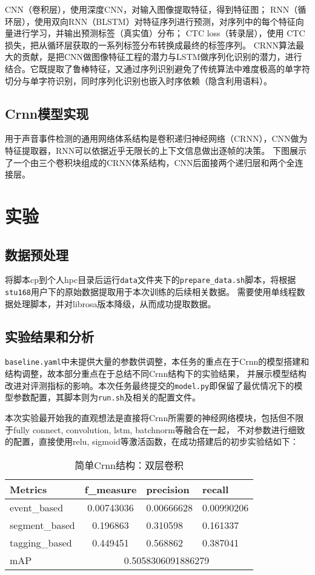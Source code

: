 \documentclass[]{ctexart}
\begin{document}
CNN（卷积层），使用深度CNN，对输入图像提取特征，得到特征图；
RNN（循环层），使用双向RNN（BLSTM）对特征序列进行预测，对序列中的每个特征向量进行学习，并输出预测标签（真实值）分布；
CTC loss（转录层），使用 CTC 损失，把从循环层获取的一系列标签分布转换成最终的标签序列。
CRNN算法最大的贡献，是把CNN做图像特征工程的潜力与LSTM做序列化识别的潜力，进行结合。它既提取了鲁棒特征，又通过序列识别避免了传统算法中难度极高的单字符切分与单字符识别，同时序列化识别也嵌入时序依赖（隐含利用语料）。
\subsection{Crnn模型实现}
用于声音事件检测的通用网络体系结构是卷积递归神经网络（CRNN），CNN做为特征提取器，RNN可以依据近乎无限长的上下文信息做出逐帧的决策。
下图展示了一个由三个卷积块组成的CRNN体系结构，CNN后面接两个递归层和两个全连接层。
\newpage
\section{实验}

\subsection{数据预处理}
将脚本cp到个人hpc目录后运行\texttt{data}文件夹下的\texttt{prepare\_data.sh}脚本，将根据\texttt{stu168}用户下的原始数据提取用于本次训练的后续相关数据。
需要使用单线程数据处理脚本，并对librosa版本降级，从而成功提取数据。
\subsection{实验结果和分析}
\texttt{baseline.yaml}中未提供大量的参数供调整，本任务的重点在于Crnn的模型搭建和结构调整，故本部分重点在于总结不同Crnn结构下的实验结果，
并展示模型结构改进对评测指标的影响。本次任务最终提交的\texttt{model.py}即保留了最优情况下的模型参数配置，其脚本则为\texttt{run.sh}及相关的配置文件。

本次实验最开始我的直观想法是直接将Crnn所需要的神经网络模块，包括但不限于fully connect, convolution, lstm, batchnorm等融合在一起，
不对参数进行细致的配置，直接使用relu, sigmoid等激活函数，在成功搭建后的初步实验结如下：
\begin{table}[ht]
    \centering
    \begin{tabular}{|l|cll|}
    \hline
    Metrics        & \multicolumn{1}{c|}{f\_measure} & \multicolumn{1}{l|}{precision}  & recall     \\ \hline
    event\_based   & \multicolumn{1}{c|}{0.00743036} & \multicolumn{1}{l|}{0.00666628} & 0.00990206 \\ \hline
    segment\_based & \multicolumn{1}{c|}{0.196863}   & \multicolumn{1}{l|}{0.310598}   & 0.161337   \\ \hline
    tagging\_based & \multicolumn{1}{c|}{0.449451}   & \multicolumn{1}{l|}{0.568862}   & 0.387041   \\ \hline
    mAP            & \multicolumn{3}{c|}{0.5058306091886279}                                        \\ \hline
    \end{tabular}
    \caption{简单Crnn结构：双层卷积}
    \label{exp1}
\end{table}
\end{document}
